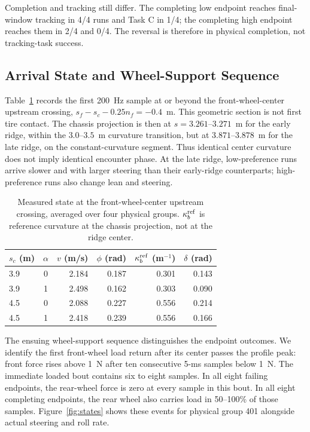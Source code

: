 \documentclass[journal]{IEEEtran}
\begin{document}
Completion and tracking still differ. The completing low endpoint reaches final-window tracking in 4/4 runs and Task C in 1/4; the completing high endpoint reaches them in 2/4 and 0/4. The reversal is therefore in physical completion, not tracking-task success.

\subsection{Arrival State and Wheel-Support Sequence}
Table~\ref{tab:arrival} records the first 200~Hz sample at or beyond the front-wheel-center upstream crossing, $s_f-s_c-0.25n_f=-0.4$~m. This geometric section is not first tire contact. The chassis projection is then at $s=3.261$--$3.271$~m for the early ridge, within the $3.0$--$3.5$~m curvature transition, but at $3.871$--$3.878$~m for the late ridge, on the constant-curvature segment. Thus identical center curvature does not imply identical encounter phase. At the late ridge, low-preference runs arrive slower and with larger steering than their early-ridge counterparts; high-preference runs also change lean and steering.

\begin{table}[t]\centering\footnotesize
\caption{Measured state at the front-wheel-center upstream crossing, averaged over four physical groups. $\kappa_b^{\rm ref}$ is reference curvature at the chassis projection, not at the ridge center.}\label{tab:arrival}
\begin{tabular}{@{}lcrrrr@{}}\toprule
$s_c$ (m) & $\alpha$ & $v$ (m/s) & $\phi$ (rad) & $\kappa_b^{\rm ref}$ (m$^{-1}$) & $\delta$ (rad)\\\midrule
3.9 & 0 & 2.184 & 0.187 & 0.301 & 0.143\\
3.9 & 1 & 2.498 & 0.162 & 0.303 & 0.090\\
4.5 & 0 & 2.088 & 0.227 & 0.556 & 0.214\\
4.5 & 1 & 2.418 & 0.239 & 0.556 & 0.166\\\bottomrule
\end{tabular}
\end{table}

The ensuing wheel-support sequence distinguishes the endpoint outcomes. We identify the first front-wheel load return after its center passes the profile peak: front force rises above 1~N after ten consecutive 5-ms samples below 1~N. The immediate loaded bout contains six to eight samples. In all eight failing endpoints, the rear-wheel force is zero at every sample in this bout. In all eight completing endpoints, the rear wheel also carries load in 50--100\% of those samples. Figure~\ref{fig:states} shows these events for physical group 401 alongside actual steering and roll rate.
\end{document}
